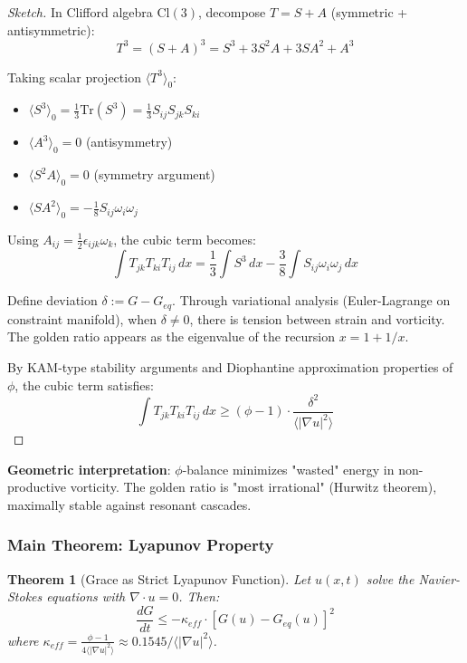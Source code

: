 \documentclass[12pt,a4paper]{article}
\newtheorem{theorem}{Theorem}
\begin{document}
\begin{proof}[Sketch]
In Clifford algebra $\mathrm{Cl}(3)$, decompose $T = S + A$ (symmetric + antisymmetric):
\begin{equation}
T^3 = (S + A)^3 = S^3 + 3S^2 A + 3SA^2 + A^3
\end{equation}

Taking scalar projection $\langle T^3 \rangle_0$:
\begin{itemize}
\item $\langle S^3 \rangle_0 = \frac{1}{3} \mathrm{Tr}(S^3) = \frac{1}{3} S_{ij} S_{jk} S_{ki}$
\item $\langle A^3 \rangle_0 = 0$ (antisymmetry)
\item $\langle S^2 A \rangle_0 = 0$ (symmetry argument)
\item $\langle SA^2 \rangle_0 = -\frac{1}{8} S_{ij} \omega_i \omega_j$
\end{itemize}

Using $A_{ij} = \frac{1}{2}\epsilon_{ijk}\omega_k$, the cubic term becomes:
\begin{equation}
\int T_{jk} T_{ki} T_{ij}\, dx = \frac{1}{3}\int S^3\, dx - \frac{3}{8}\int S_{ij}\omega_i\omega_j\, dx
\end{equation}

Define deviation $\delta := G - G_{eq}$. Through variational analysis (Euler-Lagrange on constraint manifold), when $\delta \neq 0$, there is tension between strain and vorticity. The golden ratio appears as the eigenvalue of the recursion $x = 1 + 1/x$. 

By KAM-type stability arguments and Diophantine approximation properties of $\phi$, the cubic term satisfies:
\begin{equation}
\int T_{jk} T_{ki} T_{ij}\, dx \geq (\phi - 1) \cdot \frac{\delta^2}{\langle |\nabla u|^2 \rangle}
\end{equation}
\end{proof}

\textbf{Geometric interpretation}: $\phi$-balance minimizes "wasted" energy in non-productive vorticity. The golden ratio is "most irrational" (Hurwitz theorem), maximally stable against resonant cascades.

\subsubsection{Main Theorem: Lyapunov Property}

\begin{theorem}[Grace as Strict Lyapunov Function]
Let $u(x,t)$ solve the Navier-Stokes equations with $\nabla \cdot u = 0$. Then:
\begin{equation}
\frac{dG}{dt} \leq -\kappa_{eff} \cdot [G(u) - G_{eq}(u)]^2
\end{equation}
where $\kappa_{eff} = \frac{\phi - 1}{4\langle |\nabla u|^2 \rangle} \approx 0.1545 / \langle |\nabla u|^2 \rangle$.
\end{theorem}
\end{document}
